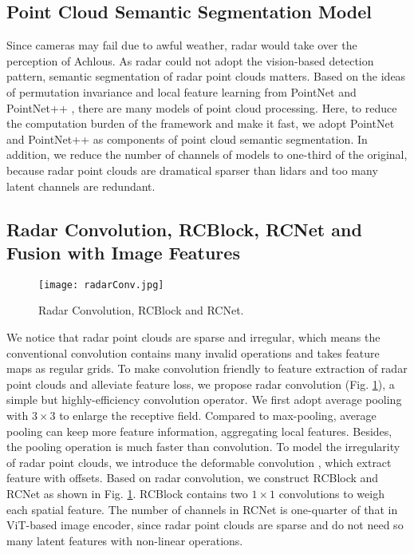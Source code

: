 \documentclass[letterpaper, 10 pt, conference]{ieeeconf}
\begin{document}
\subsection{Point Cloud Semantic Segmentation Model}
Since cameras may fail due to awful weather, radar would take over the perception of Achlous. As radar could not adopt the vision-based detection pattern, semantic segmentation of radar point clouds matters. Based on the ideas of permutation invariance and local feature learning from PointNet \cite{Charles_Su_Kaichun_Guibas_2017} and PointNet++ \cite{Qi_Yi_Su_Guibas_2017}, there are many models of point cloud processing. Here, to reduce the computation burden of the framework and make it fast, we adopt PointNet and PointNet++ as components of point cloud semantic segmentation. In addition, we reduce the number of channels of models to one-third of the original, because radar point clouds are dramatical sparser than lidars and too many latent channels are redundant.

\subsection{Radar Convolution, RCBlock, RCNet and Fusion with Image Features}
\label{subsec:rcnet}

\begin{figure}
    \centering
    \texttt{[image: radarConv.jpg]}
    \caption{Radar Convolution, RCBlock and RCNet.}
    \label{fig:radarConv}
\end{figure}

We notice that radar point clouds are sparse and irregular, which means the conventional convolution contains many invalid operations and takes feature maps as regular grids. To make convolution friendly to feature extraction of radar point clouds and alleviate feature loss, we propose radar convolution (Fig. \ref{fig:radarConv}), a simple but highly-efficiency convolution operator. We first adopt average pooling with $3 \times 3$ to enlarge the receptive field. Compared to max-pooling, average pooling can keep more feature information, aggregating local features. Besides, the pooling operation is much faster than convolution. To model the irregularity of radar point clouds, we introduce the deformable convolution \cite{zhu2019deformable}, which extract feature with offsets. Based on radar convolution, we construct RCBlock and RCNet as shown in Fig. \ref{fig:radarConv}. RCBlock contains two $1 \times 1$ convolutions to weigh each spatial feature. The number of channels in RCNet is one-quarter of that in ViT-based image encoder, since radar point clouds are sparse and do not need so many latent features with non-linear operations. 
\end{document}
